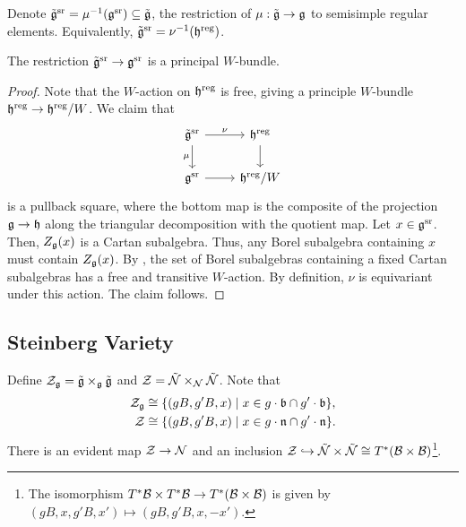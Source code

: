 Denote $\tilde{\mathfrak{g}}^{\mathrm{sr}} = \mu^{-1}(\mathfrak{g}^{\mathrm{sr}}) \subseteq \tilde{\mathfrak{g}}$, the restriction of $\mu : \tilde{\mathfrak{g}} \to \mathfrak{g}$ to semisimple regular elements. Equivalently, $\tilde{\mathfrak{g}}^{\mathrm{sr}} = \nu^{-1}(\mathfrak{h}^{\mathrm{reg}})$.
\begin{proposition}{}
    The restriction $\tilde{\mathfrak{g}}^{\mathrm{sr}} \to \mathfrak{g}^{\mathrm{sr}}$ is a principal $W$-bundle.
    \begin{proof}
        Note that the $W$-action on $\mathfrak{h}^{\mathrm{reg}}$ is free, giving a principle $W$-bundle $\mathfrak{h}^{\mathrm{reg}} \to \mathfrak{h}^{\mathrm{reg}}/W$. We claim that
        \begin{equation*}
            \begin{tikzcd}
                \tilde{\lie{g}}^{\mathrm{sr}} \arrow[r, "\nu"] \arrow[d, "\mu"'] & \lie{h}^{\mathrm{reg}} \arrow[d] \\
                \lie{g}^{\mathrm{sr}} \arrow[r] & \lie{h}^{\mathrm{reg}}/W
            \end{tikzcd}
        \end{equation*}
        is a pullback square, where the bottom map is the composite of the projection $\mathfrak{g} \to \mathfrak{h}$ along the triangular decomposition with the quotient map. Let $x \in \mathfrak{g}^{\mathrm{sr}}$. Then, $Z_{\mathfrak{g}}(x)$ is a Cartan subalgebra. Thus, any Borel subalgebra containing $x$ must contain $Z_{\mathfrak{g}}(x)$. By , the set of Borel subalgebras containing a fixed Cartan subalgebras has a free and transitive $W$-action. By definition, $\nu$ is equivariant under this action. The claim follows.
    \end{proof}
\end{proposition}

\subsection{Steinberg Variety}
\label{sec:steinberg_variety}

Define $\mathcal{Z}_{\mathfrak{g}} = \tilde{\mathfrak{g}} \times_{\mathfrak{g}} \tilde{\mathfrak{g}}$ and $\mathcal{Z} = \tilde{\mathcal{N}} \times_{\mathcal{N}} \tilde{\mathcal{N}}$. Note that
\begin{align*}
    \mathcal{Z}_{\mathfrak{g}} &\cong \{ (gB, g'B, x) \mid x \in g \cdot \mathfrak{b} \cap g' \cdot \mathfrak{b} \}, \\
    \mathcal{Z} &\cong \{ (gB, g'B, x) \mid x \in g \cdot \mathfrak{n} \cap g' \cdot \mathfrak{n} \}.
\end{align*}
There is an evident map $\mathcal{Z} \to \mathcal{N}$ and an inclusion $\mathcal{Z} \hookrightarrow \tilde{\mathcal{N}} \times \tilde{\mathcal{N}} \cong T^*(\mathcal{B} \times \mathcal{B})$\footnote{The isomorphism $T^*\mathcal{B} \times T^*\mathcal{B} \to T^*(\mathcal{B} \times \mathcal{B})$ is given by $(gB, x, g'B, x') \mapsto (gB, g'B, x, -x')$.}.

